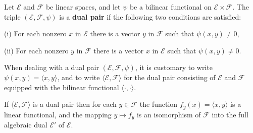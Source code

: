 Let $\mathcal{E}$ and $\mathcal{F}$ be linear spaces, and let $\psi$ be a bilinear functional on $\mathcal{E} \times \mathcal{F}$. The triple $(\mathcal{E}, \mathcal{F}, \psi)$ is a \textbf{dual pair} if the following two conditions are satisfied:

(i) For each nonzero $x$ in $\mathcal{E}$ there is a vector $y$ in $\mathcal{F}$ such that $\psi(x, y) \neq 0$,

(ii) For each nonzero $y$ in $\mathcal{F}$ there is a vector $x$ in $\mathcal{E}$ such that $\psi(x, y) \neq 0$.

When dealing with a dual pair $(\mathcal{E}, \mathcal{F}, \psi)$, it is customary to write $\psi(x, y) = \langle x, y \rangle$, and to write $\langle \mathcal{E}, \mathcal{F} \rangle$ for the dual pair consisting of $\mathcal{E}$ and $\mathcal{F}$ equipped with the bilinear functional $\langle \cdot, \cdot \rangle$.

If $\langle \mathcal{E}, \mathcal{F} \rangle$ is a dual pair then for each $y \in \mathcal{F}$ the function $f_y(x) = \langle x, y \rangle$ is a linear functional, and the mapping $y \mapsto f_y$ is an isomorphism of $\mathcal{F}$ into the full algebraic dual $\mathcal{E}'$ of $\mathcal{E}$.
